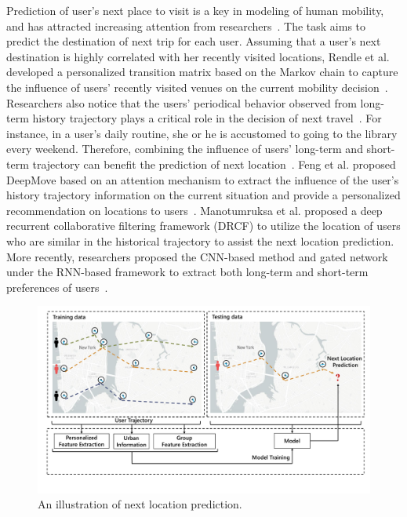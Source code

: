 \documentclass[10pt,journal,compsoc]{IEEEtran}
\begin{document}
Prediction of user's next place to visit is a key in modeling of human mobility, and has attracted increasing attention from researchers~\cite{alhasoun2017city}. The task aims to predict the destination of next trip for each user. Assuming that a user's next destination is highly correlated with her recently visited locations, Rendle et al. developed a personalized transition matrix based on the Markov chain to capture the influence of users’ recently visited venues on the current mobility decision~\cite{rendle2010factorizing}. Researchers also notice that the users’ periodical behavior observed from long-term history trajectory plays a critical role in the decision of next travel~\cite{wu2019long,jiang2020predicting}. For instance, in a user's daily routine, she or he is accustomed to going to the library every weekend. Therefore, combining the influence of users’ long-term and short-term trajectory can benefit the prediction of next location~\cite{feng2018deepmove, manotumruksa2017deep}. Feng et al. proposed DeepMove based on an attention mechanism to extract the influence of the user’s history trajectory information on the current situation and provide a personalized recommendation on locations to users~\cite{feng2018deepmove}. Manotumruksa et al. proposed a deep recurrent collaborative filtering framework (DRCF) to utilize the location of users who are similar in the historical trajectory to assist the next location prediction. More recently, researchers proposed the CNN-based method and gated network under the RNN-based framework to extract both long-term and short-term preferences of users~\cite{chen2020predicting,sun2020go}. 

\begin{figure}[htpb]
    \centering
    \includegraphics[width=14cm]{figure/fig1.pdf}
    \caption{An illustration of next location prediction.}
    \label{fig.1}
\end{figure}
\end{document}
